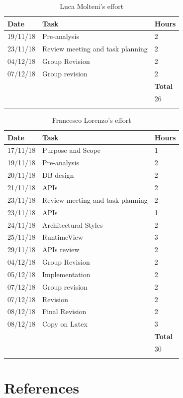 \documentclass[titlepage]{article}
\begin{document}
		\begin{longtable}{| p{2 cm} | p{5 cm} | p{2 cm} |} 
		\hline
		{\bf Date} & {\bf Task} & {\bf Hours}\\
		\hline
		19/11/18 & Pre-analysis & 2 \\
		23/11/18 & Review meeting and task planning & 2 \\
		04/12/18 & Group Revision & 2\\
		07/12/18 & Group revision & 2 \\
		\hline
		& & {\bf Total} \\
		\hline
		& & 26 \\
		\hline
		\caption{Luca Molteni's effort}
	\end{longtable}
	
	\begin{longtable}{| p{2 cm} | p{5 cm} | p{2 cm} |} 
		\hline
		{\bf Date} & {\bf Task} & {\bf Hours}\\
		\hline
		17/11/18 & Purpose and Scope & 1 \\
		19/11/18 & Pre-analysis & 2 \\
		20/11/18 & DB design & 2 \\
		21/11/18 & APIs & 2 \\
		23/11/18 & Review meeting and task planning & 2 \\
		23/11/18 & APIs & 1 \\
		24/11/18 & Architectural Styles & 2 \\
		25/11/18 & RuntimeView & 3 \\
		29/11/18 & APIs review & 2 \\
		04/12/18 & Group Revision & 2 \\
		05/12/18 & Implementation & 2 \\
		07/12/18 & Group revision & 2 \\
		07/12/18 & Revision & 2 \\
		08/12/18 & Final Revision & 2 \\
		08/12/18 & Copy on Latex & 3 \\
		\hline
		& & {\bf Total} \\
		\hline
		& & 30 \\
		\hline
		\caption{Francesco Lorenzo's effort}
	\end{longtable}


\pagebreak


\section{References}
\end{document}
